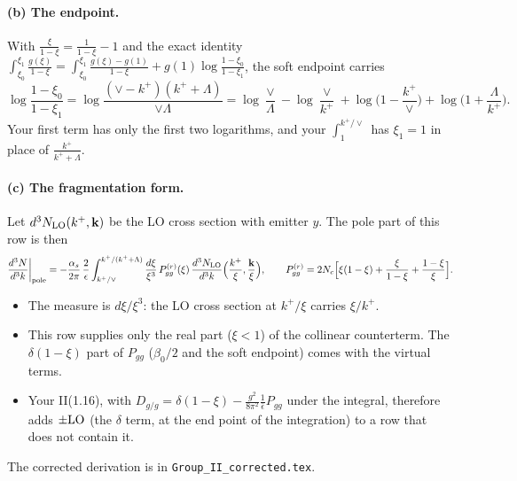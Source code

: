\documentclass[10pt]{article}
\numberwithin{equation}{section}
\begin{document}
\paragraph{(b) The endpoint.} With $\frac{\xi}{1-\xi}=\frac1{1-\xi}-1$ and the exact identity $\int_{\xi_0}^{\xi_1}\frac{g(\xi)}{1-\xi}=\int_{\xi_0}^{\xi_1}\frac{g(\xi)-g(1)}{1-\xi}+g(1)\log\frac{1-\xi_0}{1-\xi_1}$, the soft endpoint carries
\begin{equation}
\log\frac{1-\xi_0}{1-\xi_1}=\log\frac{(\vee-k^+)(k^++\Lambda)}{\vee\Lambda}=\log\frac{\vee}{\Lambda}-\log\frac{\vee}{k^+}+\log\Big(1-\frac{k^+}{\vee}\Big)+\log\Big(1+\frac{\Lambda}{k^+}\Big).
\end{equation}
Your first term has only the first two logarithms, and your $\int_1^{k^+/\vee}$ has $\xi_1=1$ in place of $\frac{k^+}{k^++\Lambda}$.

\paragraph{(c) The fragmentation form.} Let $d^3N_{\rm LO}(k^+,\mathbf k)$ be the LO cross section with emitter $y$. The pole part of this row is then
\begin{equation}
\frac{d^{3}N}{d^{3}k}\bigg|_{\rm pole}=-\frac{\alpha_{s}}{2\pi}\,\frac{2}{\epsilon}\int_{k^{+}/\vee}^{k^{+}/(k^{+}+\Lambda)}\frac{d\xi}{\xi^{3}}\,P^{(r)}_{gg}(\xi)\,\frac{d^{3}N_{\rm LO}}{d^{3}k}\Big(\frac{k^{+}}{\xi},\frac{\mathbf k}{\xi}\Big),\qquad P^{(r)}_{gg}=2N_{c}\Big[\xi(1-\xi)+\frac{\xi}{1-\xi}+\frac{1-\xi}{\xi}\Big].
\end{equation}
\begin{itemize}
\item The measure is $d\xi/\xi^3$: the LO cross section at $k^+/\xi$ carries $\xi/k^+$.
\item This row supplies only the real part ($\xi<1$) of the collinear counterterm. The $\delta(1-\xi)$ part of $P_{gg}$ ($\beta_0/2$ and the soft endpoint) comes with the virtual terms.
\item Your II(1.16), with $D_{g/g}=\delta(1-\xi)-\frac{g^2}{8\pi^2}\frac1{\bar\epsilon}P_{gg}$ under the integral, therefore adds $\pm{\rm LO}$ (the $\delta$ term, at the end point of the integration) to a row that does not contain it.
\end{itemize}
The corrected derivation is in \texttt{Group\_II\_corrected.tex}.

\end{document}
